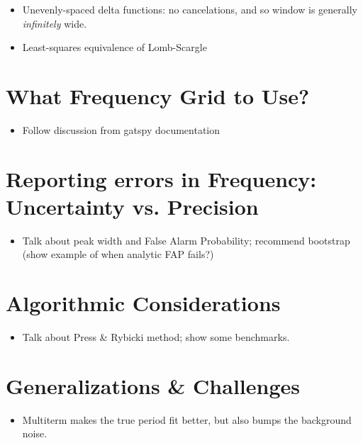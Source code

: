 \documentclass[preprint]{aastex}
\begin{document}
\begin{itemize}
\item Unevenly-spaced delta functions: no cancelations, and so window is generally {\it infinitely} wide.
\item Least-squares equivalence of Lomb-Scargle
\end{itemize}

\section{What Frequency Grid to Use?}

\begin{itemize}
\item Follow discussion from gatspy documentation
\end{itemize}

\section{Reporting errors in Frequency: Uncertainty vs. Precision}

\begin{itemize}
\item Talk about peak width and False Alarm Probability; recommend bootstrap (show example of when analytic FAP fails?)
\end{itemize}

\section{Algorithmic Considerations}

\begin{itemize}
\item Talk about Press \& Rybicki method; show some benchmarks.
\end{itemize}

\section{Generalizations \& Challenges}

\begin{itemize}
\item Multiterm makes the true period fit better, but also bumps the background noise.
\end{itemize}

\citet{VanderPlas2015}



\end{document}
